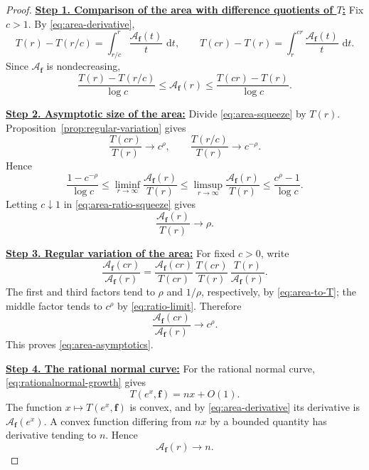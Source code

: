 \documentclass[12pt,letterpaper,reqno]{amsart}
\theoremstyle{definition}
\numberwithin{equation}{section}
\newcommand{\dd}{\,\mathrm d}
\newcommand{\fv}{\bm f}
\begin{document}
\begin{proof}

\medskip\noindent
\textbf{\underline{Step 1. Comparison of the area with difference quotients of \(T\):}}
Fix \(c>1\). By \eqref{eq:area-derivative},
\[
T(r)-T(r/c)
=
\int_{r/c}^{r}
\frac{\mathcal A_{\fv}(t)}{t}\,\dd t,
\qquad
T(cr)-T(r)
=
\int_r^{cr}
\frac{\mathcal A_{\fv}(t)}{t}\,\dd t.
\]
Since \(\mathcal A_{\fv}\) is nondecreasing,
\begin{equation}\label{eq:area-squeeze}
 \frac{T(r)-T(r/c)}{\log c}
 \leq
 \mathcal A_{\fv}(r)
 \leq
 \frac{T(cr)-T(r)}{\log c}.
\end{equation}


\medskip\noindent
\textbf{\underline{Step 2. Asymptotic size of the area:}}
Divide \eqref{eq:area-squeeze} by \(T(r)\).
Proposition~\ref{prop:regular-variation} gives
\[
\frac{T(cr)}{T(r)}\longrightarrow c^\rho,
\qquad
\frac{T(r/c)}{T(r)}\longrightarrow c^{-\rho}.
\]
Hence
\begin{equation}\label{eq:area-ratio-squeeze}
 \frac{1-c^{-\rho}}{\log c}
 \leq
 \liminf_{r\to\infty}
 \frac{\mathcal A_{\fv}(r)}{T(r)}
 \leq
 \limsup_{r\to\infty}
 \frac{\mathcal A_{\fv}(r)}{T(r)}
 \leq
 \frac{c^\rho-1}{\log c}.
\end{equation}
Letting \(c\downarrow1\) in
\eqref{eq:area-ratio-squeeze} gives
\begin{equation}\label{eq:area-to-T}
 \frac{\mathcal A_{\fv}(r)}{T(r)}
 \longrightarrow\rho.
\end{equation}


\medskip\noindent
\textbf{\underline{Step 3. Regular variation of the area:}}
For fixed \(c>0\), write
\[
\frac{\mathcal A_{\fv}(cr)}
     {\mathcal A_{\fv}(r)}
=
\frac{\mathcal A_{\fv}(cr)}
     {T(cr)}
\,
\frac{T(cr)}{T(r)}
\,
\frac{T(r)}
     {\mathcal A_{\fv}(r)}.
\]
The first and third factors tend to
\(\rho\) and \(1/\rho\), respectively, by
\eqref{eq:area-to-T}; the middle factor tends to \(c^\rho\) by
\eqref{eq:ratio-limit}. Therefore
\[
\frac{\mathcal A_{\fv}(cr)}
     {\mathcal A_{\fv}(r)}
\longrightarrow c^\rho.
\]
This proves \eqref{eq:area-asymptotics}.


\medskip\noindent
\textbf{\underline{Step 4. The rational normal curve:}}
For the rational normal curve,
\eqref{eq:rationalnormal-growth} gives
\[
T(e^x,\fv)=n x+O(1).
\]
The function \(x\mapsto T(e^x,\fv)\) is convex, and by
\eqref{eq:area-derivative} its derivative is
\(\mathcal A_{\fv}(e^x)\). A convex function differing from
\(n x\) by a bounded quantity has derivative tending to \(n\).
Hence
\[
\mathcal A_{\fv}(r)\longrightarrow n.
\]
\end{proof}
\end{document}
